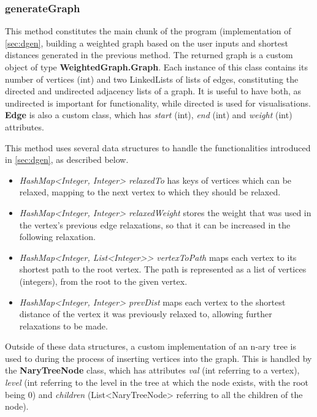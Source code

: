 \documentclass{l4proj}
\begin{document}
\subsubsection{generateGraph}
\label{sec:generateGraph}

This method constitutes the main chunk of the program (implementation of \autoref{sec:dgen}, building a weighted graph based on the user inputs and shortest distances generated in the previous method. The returned graph is a custom object of type \textbf{WeightedGraph.Graph}. Each instance of this class contains its number of vertices (int) and two LinkedLists of lists of edges, constituting the directed and undirected adjacency lists of a graph. It is useful to have both, as undirected is important for functionality, while directed is used for visualisations. \textbf{Edge} is also a custom class, which has \emph{start} (int), \emph{end} (int) and \emph{weight} (int) attributes.

This method uses several data structures to handle the functionalities introduced in \autoref{sec:dgen}, as described below.
\begin{itemize}
	\item
	\emph{HashMap<Integer, Integer> relaxedTo} has keys of vertices which can be relaxed, mapping to the next vertex to which they should be relaxed.
	\item
	\emph{HashMap<Integer, Integer> relaxedWeight} stores the weight that was used in the vertex's previous edge relaxations, so that it can be increased in the following relaxation.
	\item
	\emph{HashMap<Integer, List<Integer>> vertexToPath} maps each vertex to its shortest path to the root vertex. The path is represented as a list of vertices (integers), from the root to the given vertex.
	\item
	\emph{HashMap<Integer, Integer> prevDist} maps each vertex to the shortest distance of the vertex it was previously relaxed to, allowing further relaxations to be made.
\end{itemize}

Outside of these data structures, a custom implementation of an n-ary tree is used to during the process of inserting vertices into the graph. This is handled by the \textbf{NaryTreeNode} class, which has attributes \emph{val} (int referring to a vertex), \emph{level} (int referring to the level in the tree at which the node exists, with the root being $0$) and \emph{children} (List<NaryTreeNode> referring to all the children of the node). 
\end{document}
